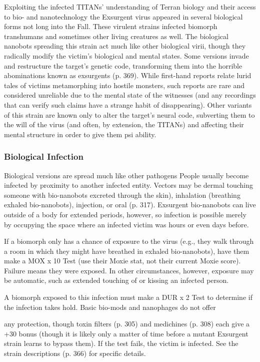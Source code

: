 Exploiting the infected TITANs' understanding of Terran biology and their access to bio- and nanotechnology the Exsurgent virus appeared in several biological forms not long into the Fall. These virulent strains infected biomorph transhumans and sometimes other living creatures as well. The biological nanobots spreading this strain act much like other biological virii, though they radically modify the victim's biological and mental states. Some versions invade and restructure the target's genetic code, transforming them into the horrible abominations known as exsurgents (p. 369). While first-hand reports relate lurid tales of victims metamorphing into hostile monsters, such reports are rare and considered unreliable due to the mental state of the witnesses (and any recordings that can verify such claims have a strange habit of disappearing). Other variants of this strain are known only to alter the target's neural code, subverting them to the will of the virus (and often, by extension, the TITANs) and affecting their mental structure in order to give them psi ability. 

\subsubsection{Biological Infection} 

Biological versions are spread much like other pathogens People usually become infected by proximity to another infected entity. Vectors may be dermal touching someone with bio-nanobots excreted through the skin), inhalation (breathing exhaled bio-nanobots), injection, or oral (p. 317). Exsurgent bio-nanobots can live outside of a body for extended periods, however, so infection is possible merely by occupying the space where an infected victim was hours or even days before. 

If a biomorph only has a chance of exposure to the virus (e.g., they walk through a room in which they might have breathed in exhaled bio-nanobots), have them make a MOX x 10 Test (use their Moxie stat, not their current Moxie score). Failure means they were exposed. In other circumstances, however, exposure may be automatic, such as extended touching of or kissing an infected person. 

A biomorph exposed to this infection must make a DUR x 2 Test to determine if the infection takes hold. Basic bio-mods and nanophages do not offer 

any protection, though toxin filters (p. 305) and medichines (p. 308) each give a +30 bonus (though it is likely only a matter of time before a mutant Exsurgent strain learns to bypass them). If the test fails, the victim is infected. See the strain descriptions (p. 366) for specific details. 

